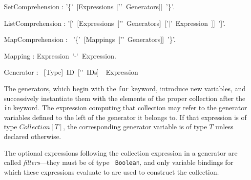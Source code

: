 
\bgr
SetComprehension : '\{'~[Expressions~['\charColon'~Generators]]~'\}'.

ListComprehension : '['~[Expressions~['\charColon'~Generators]~['$\mid$'~Expression~]]~']'.

MapComprehension : \kwMap~'\{'~[Mappings~['\charColon'~Generators]]~'\}'.

Mapping : Expression~'-\charMore'~Expression.

Generator : \kwFor~[Type]~ID~['\charComma'~IDs]~\kwIn~Expression~
\egr


The generators, which begin with the {\tt for} keyword, introduce new
variables, and successively instantiate them with the elements of the
proper collection after the {\tt in} keyword. The expression computing that
collection may refer to the generator variables defined to the left of
the generator it belongs to. If that expression is of type
$Collection[T]$, the corresponding generator variable is of type $T$
unless declared otherwise.


The optional expressions following the collection expression in a
generator are called {\em filters}---they must be of type {\tt
  Boolean}, and only variable bindings for which these expressions
evaluate to \kwTrue are used to construct the collection.

